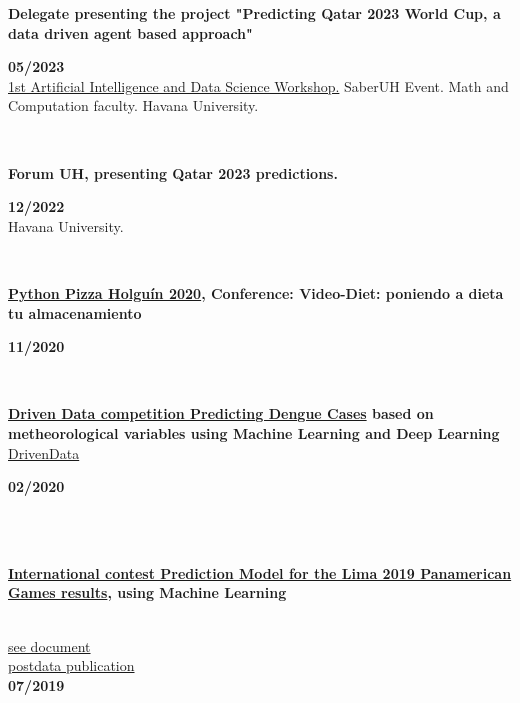 \documentclass{article}
\begin{document}
\begin{minipage}{0.8\textwidth}
    \parbox{0.8\linewidth}{\textbf{Delegate presenting the project "Predicting Qatar 2023 World Cup, a data driven agent based approach" }} \hfill \textbf{05/2023}\\
    \hyperref[sec:workshop]{1st Artificial Intelligence and Data Science Workshop.} SaberUH Event. Math and Computation faculty. Havana University.\\
\end{minipage} \\
\begin{minipage}{0.8\textwidth}
    \parbox{0.8\linewidth}{\textbf{Forum UH, presenting Qatar 2023 predictions.}} \hfill \textbf{12/2022}\\
    Havana University.\\
\end{minipage}\\
\begin{minipage}{0.8\textwidth}
    \parbox{0.8\linewidth}{\textbf{\hyperref[sec:pythonpizza]{Python Pizza Holguín 2020}, Conference: Video-Diet: poniendo a dieta tu almacenamiento}} \hfill \textbf{11/2020}\\
\end{minipage} \\
\begin{minipage}{0.8\textwidth}
    \parbox{0.8\linewidth}{\textbf{\hyperref[sec:dengue]{Driven Data competition Predicting Dengue Cases} based on metheorological variables using Machine Learning and Deep Learning} \href{https://www.drivendata.org/competitions/44/dengai-predicting-disease-spread}{DrivenData}} \hfill \textbf{02/2020}\\
    \\
\end{minipage} \hfill {}\\
\begin{minipage}{0.8\textwidth}
    \parbox{0.8\linewidth}{\textbf{\hyperref[sec:panamerican]{International contest Prediction Model for the Lima 2019 Panamerican Games results}, using Machine Learning} }\\
    \href{https://github.com/JavierOramas/PanamericanPredictor/blob/master/panamerican_predictor_paper.pdf}{see document}\\
    \href{http://www.postdata.club/issues/201907/el-medallero-de-lima-2019-que-se-puede-esperar.html}{postdata publication}\\
    \hfill \textbf{07/2019}\\
    \\
\end{minipage} \hfill {}\\
\end{document}
